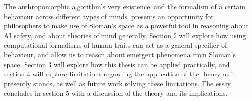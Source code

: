 The anthropomorphic algorithm's very existence, and the formalism of a certain behaviour across different types of minds, presents an opportunity for philosophers to make use of Sloman's space as a powerful tool in reasoning about AI safety, and about theories of mind generally. Section 2 will explore how using computational formalisms of human traits can act as a general specifier of behaviour, and allow us to reason about emergent phenomena from Sloman's space. Section 3 will explore how this thesis can be applied practically, and section 4 will explore limitations regarding the application of the theory as it presently stands, as well as future work solving these limitations. The essay concludes in section 5 with a discussion of the theory and its implications.\par
